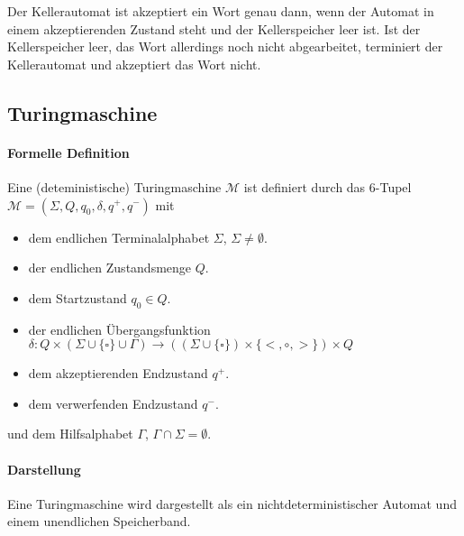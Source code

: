             Der Kellerautomat ist akzeptiert ein Wort genau dann, wenn der Automat in einem akzeptierenden Zustand steht und der Kellerspeicher leer ist. Ist der Kellerspeicher leer, das Wort allerdings noch nicht abgearbeitet, terminiert der Kellerautomat und akzeptiert das Wort nicht.


    \subsection{Turingmaschine}
        \paragraph{Formelle Definition}
            Eine (deteministische) Turingmaschine $ \mathcal{M} $ ist definiert durch das 6-Tupel $ \mathcal{M} = (\Sigma, Q, q _ 0, \delta, q ^ +, q ^ -) $ mit
            \begin{itemize}
                \item dem endlichen Terminalalphabet $ \Sigma $, $ \Sigma \neq \emptyset $.
                \item der endlichen Zustandsmenge $ Q $.
                \item dem Startzustand $ q _ 0 \in Q $.
                \item der endlichen Übergangsfunktion $ \delta : Q \times (\Sigma \cup \{ \square \} \cup \Gamma) \rightarrow ((\Sigma \cup \{ \square \}) \times \{ <, \circ, > \}) \times Q $
                \item dem akzeptierenden Endzustand $ q ^ + $.
                \item dem verwerfenden Endzustand $ q ^ - $.
            \end{itemize}
            und dem Hilfsalphabet $ \Gamma $, $ \Gamma \cap \Sigma = \emptyset $.

        \paragraph{Darstellung}
            Eine Turingmaschine wird dargestellt als ein nichtdeterministischer Automat und einem unendlichen Speicherband.


